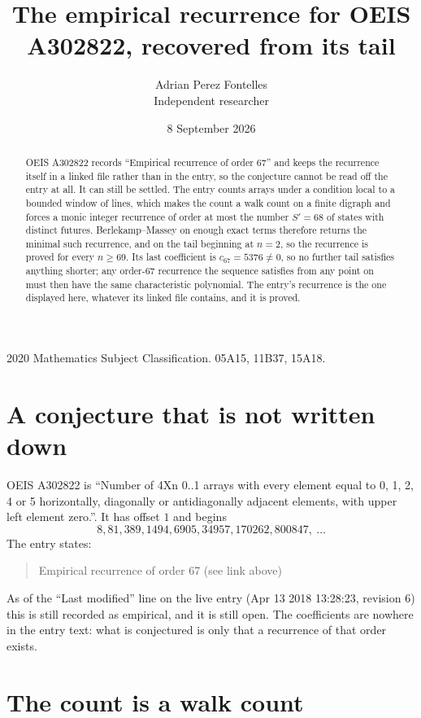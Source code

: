 \documentclass[11pt,a4paper]{article}
\title{The empirical recurrence for OEIS A302822, recovered from its tail}
\author{Adrian Perez Fontelles\\ \small Independent researcher}
\date{8 September 2026}
\theoremstyle{plain}
\theoremstyle{definition}
\begin{document}
\maketitle

\begin{abstract}
OEIS A302822 records ``Empirical recurrence of order $67$'' and keeps the recurrence itself in
a linked file rather than in the entry, so the conjecture cannot be read off the entry at all.
It can still be settled. The entry counts arrays under a condition local to a bounded window of
lines, which makes the count a walk count on a finite digraph and forces a monic integer
recurrence of order at most the number $S'=68$ of states with distinct futures. Berlekamp--Massey on
enough exact terms therefore returns the minimal such recurrence, and on the tail beginning at $n=2$, so the recurrence is proved for every $n\ge69$.
Its last coefficient is $c_{67}=5376\neq0$, so no further tail satisfies anything
shorter; any order-$67$ recurrence the sequence satisfies from any point on must then have
the same characteristic polynomial. The entry's recurrence is the one displayed here, whatever
its linked file contains, and it is proved.
\end{abstract}

\noindent\small 2020 Mathematics Subject Classification. 05A15, 11B37, 15A18.\normalsize

\section{A conjecture that is not written down}

OEIS A302822 is ``Number of 4Xn 0..1 arrays with every element equal to 0, 1, 2, 4 or 5 horizontally, diagonally or antidiagonally adjacent elements, with upper left element zero.''. It has offset $1$ and begins
\[
8, 81, 389, 1494, 6905, 34957, 170262, 800847,\ \dots
\]
The entry states:
\begin{quote}
Empirical recurrence of order 67 (see link above)
\end{quote}
As of the ``Last modified'' line on the live entry (Apr 13 2018 13:28:23, revision 6)
this is still recorded as empirical, and it is still open. The coefficients are nowhere in the
entry text: what is conjectured is only that a recurrence of that order exists.

\section{The count is a walk count}
\end{document}
